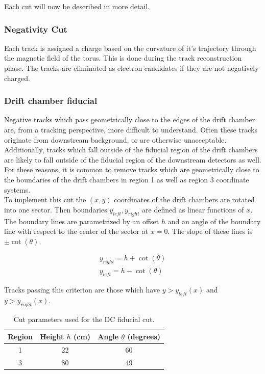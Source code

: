 Each cut will now be described in more detail.

\subsubsection*{Negativity Cut}
Each track is assigned a charge based on the curvature of it's trajectory through the magnetic field of the torus.  This is done during the track reconstruction phase.  The tracks are eliminated as electron candidates if they are not negatively charged.

\subsubsection*{Drift chamber fiducial}
Negative tracks which pass geometrically close to the edges of the drift chamber are, from a tracking perspective, more difficult to understand.  Often these tracks originate from downstream background, or are otherwise unacceptable.  Additionally, tracks which fall outside of the fiducial region of the drift chambers are likely to fall outside of the fiducial region of the downstream detectors as well.  For these reasons, it is common to remove tracks which are geometrically close to the boundaries of the drift chambers in region 1 as well as region 3 coordinate systems.\\

To implement this cut the $(x,y)$ coordinates of the drift chambers are rotated into one sector.  Then boundaries $y_{left}, y_{right}$ are defined as linear functions of $x$. The boundary lines are parametrized by an offset $h$ and an angle of the boundary line with respect to the center of the sector at $x = 0$.  The slope of these lines is $\pm \cot(\theta)$.  

\begin{eqnarray}
  y_{right} = h + \cot(\theta) \\
  y_{left} = h - \cot(\theta) 
\end{eqnarray}

Tracks passing this criterion are those which have $y > y_{left}(x)$ and $y > y_{right}(x)$.  

\begin{table}
  \centering
  \begin{tabular}{c|c|c}
    Region & Height $h$ (cm) & Angle $\theta$ (degrees)\\
    \hline 
    1 & 22 & 60 \\
    3 & 80 & 49
  \end{tabular}
  \caption{Cut parameters used for the DC fiducial cut.}
\end{table}

